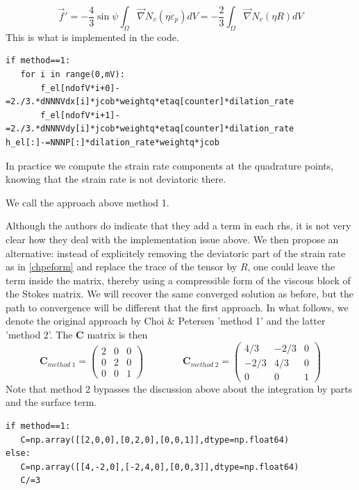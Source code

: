 \begin{equation}
\vec f' 
=
-\frac{4}{3}\sin\psi\int_\Omega \vec\nabla N_v (\eta \dot{\varepsilon}_p) dV
=
-\frac{2}{3} \int_\Omega \vec\nabla N_v (\eta R) dV
\end{equation}
This is what is implemented in the code.
\begin{lstlisting}
if method==1:
   for i in range(0,mV):
       f_el[ndofV*i+0]-=2./3.*dNNNVdx[i]*jcob*weightq*etaq[counter]*dilation_rate
       f_el[ndofV*i+1]-=2./3.*dNNNVdy[i]*jcob*weightq*etaq[counter]*dilation_rate
h_el[:]-=NNNP[:]*dilation_rate*weightq*jcob
\end{lstlisting}
In practice we compute the strain rate components at the quadrature points, knowing that 
the strain rate is not deviatoric there.

We call the approach above method 1.

\vspace{0.5cm}

Although the authors do indicate that they add a term in each rhs, it is not very clear how they deal with
the implementation issue above. We then propose an alternative: instead of explicitely removing the deviatoric 
part of the strain rate as in \eqref{chpeform} and replace the trace of the tensor by $R$, one could 
leave the term inside the matrix, thereby using a compressible form of the viscous block of the Stokes 
matrix. We will recover the same converged solution as before, but the path to convergence will be 
different that the first approach.
In what follows, we denote the original approach by Choi \& Petersen 'method 1' and the latter 'method 2'.
The ${\bm C}$ matrix is then 
\[
{\bm C}_{method\; 1}
=
\left(
\begin{array}{ccc}
2 &0 &0 \\
0 &2 &0 \\
0 &0 &1
\end{array}
\right)
\qquad\qquad
{\bm C}_{method\; 2}
=
\left(
\begin{array}{ccc}
4/3 &-2/3 &0 \\
-2/3 & 4/3 &0 \\
0 &0 &1
\end{array}
\right)
\]
Note that method 2 bypasses the discussion above about the integration by parts and the surface term. 

\begin{lstlisting}
if method==1:
   C=np.array([[2,0,0],[0,2,0],[0,0,1]],dtype=np.float64) 
else:
   C=np.array([[4,-2,0],[-2,4,0],[0,0,3]],dtype=np.float64) 
   C/=3
\end{lstlisting}

